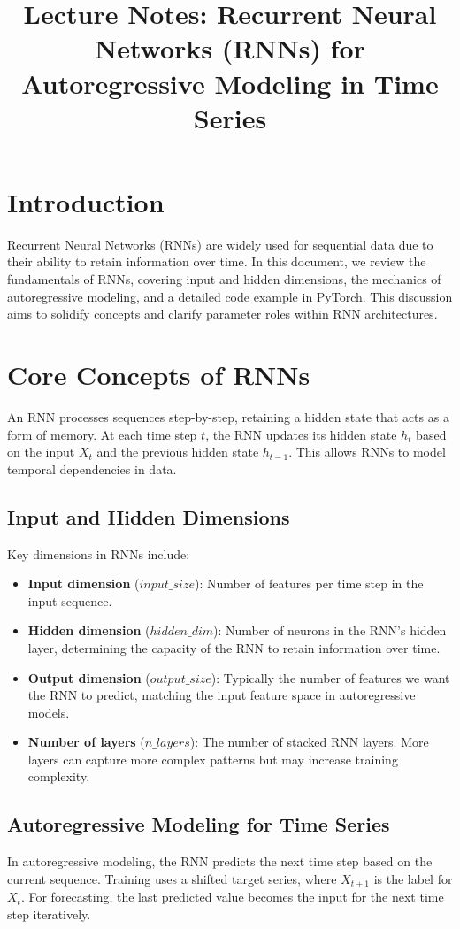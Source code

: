 \documentclass{article}
\title{Lecture Notes: Recurrent Neural Networks (RNNs) for Autoregressive Modeling in Time Series}
\author{}
\date{}
\begin{document}
\maketitle

\section{Introduction}
Recurrent Neural Networks (RNNs) are widely used for sequential data due to their ability to retain information over time. In this document, we review the fundamentals of RNNs, covering input and hidden dimensions, the mechanics of autoregressive modeling, and a detailed code example in PyTorch. This discussion aims to solidify concepts and clarify parameter roles within RNN architectures.

\section{Core Concepts of RNNs}
An RNN processes sequences step-by-step, retaining a hidden state that acts as a form of memory. At each time step $t$, the RNN updates its hidden state $h_t$ based on the input $X_t$ and the previous hidden state $h_{t-1}$. This allows RNNs to model temporal dependencies in data.

\subsection{Input and Hidden Dimensions}
Key dimensions in RNNs include:
\begin{itemize}
    \item \textbf{Input dimension} ($input\_size$): Number of features per time step in the input sequence.
    \item \textbf{Hidden dimension} ($hidden\_dim$): Number of neurons in the RNN’s hidden layer, determining the capacity of the RNN to retain information over time.
    \item \textbf{Output dimension} ($output\_size$): Typically the number of features we want the RNN to predict, matching the input feature space in autoregressive models.
    \item \textbf{Number of layers} ($n\_layers$): The number of stacked RNN layers. More layers can capture more complex patterns but may increase training complexity.
\end{itemize}

\subsection{Autoregressive Modeling for Time Series}
In autoregressive modeling, the RNN predicts the next time step based on the current sequence. Training uses a shifted target series, where $X_{t+1}$ is the label for $X_t$. For forecasting, the last predicted value becomes the input for the next time step iteratively.
\end{document}
